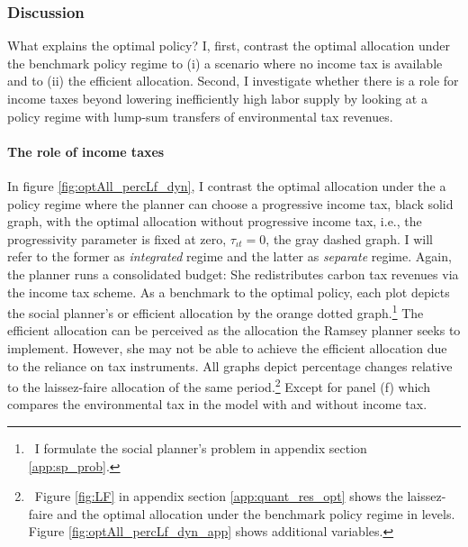 %





\subsubsection{Discussion}\label{subsec:dis}

 What explains the optimal policy?
 I, first, contrast the optimal allocation under the benchmark policy regime to (i) a scenario where no income tax is available and to (ii) the efficient allocation. Second, I investigate whether there is a role for income taxes beyond lowering inefficiently high labor supply by looking at a policy regime with lump-sum transfers of environmental tax revenues. 

\paragraph{The role of income taxes}\label{subsec:notaul}

In figure \ref{fig:optAll_percLf_dyn}, I contrast the optimal allocation under the a policy regime where the planner can choose a progressive income tax, black solid graph, with the optimal allocation without progressive income tax, i.e., the progressivity parameter is fixed at zero, $\tau_{\iota t}=0$, the gray dashed graph. I will refer to the former as \textit{integrated} regime and the latter as \textit{separate} regime. Again, the planner runs a consolidated budget: She redistributes carbon tax revenues via the income tax scheme.  As a benchmark to the optimal policy, each plot depicts the social planner's or efficient allocation by the orange dotted graph.\footnote{\ I formulate the social planner's problem in appendix section \ref{app:sp_prob}.} 
The efficient allocation can be perceived as the allocation the Ramsey planner seeks to implement. However, she may not be able to achieve the efficient allocation due to the reliance on tax instruments.
All graphs depict percentage changes relative to the laissez-faire allocation of the same period.\footnote{\ Figure \ref{fig:LF} in appendix section \ref{app:quant_res_opt} shows the laissez-faire and the optimal allocation under the benchmark policy regime in levels. Figure \ref{fig:optAll_percLf_dyn_app} shows additional variables.}
 Except for panel (f) which compares the environmental tax in the model with and without income tax. 

